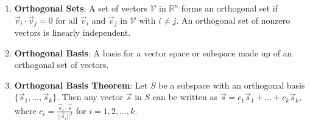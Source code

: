 \documentclass[10pt]{article}
\begin{document}
\begin{enumerate}
\item \textbf{Orthogonal Sets}: A set of vectors $\mathcal{V}$ in $\mathbb{R}^n$ forms an orthogonal set if $\vec{v}_i \cdot \vec{v}_j = 0$ for all $\vec{v}_i$ and $\vec{v}_j$ in $\mathcal{V}$ with $i \neq j$. An orthogonal set of nonzero vectors is linearly independent.
\item \textbf{Orthogonal Basis}: A basis for a vector space or subspace made up of an orthogonal set of vectors.
\item \textbf{Orthogonal Basis Theorem}: Let $S$ be a subspace with an orthogonal basis $\lbrace \vec{s}_1,...,\vec{s}_k \rbrace$. Then any vector $\vec{s}$ in $S$ can be written as $\vec{s} = c_1\vec{s}_1 + ... + c_k\vec{s}_k$, where $c_i = \frac{\vec{s}_i \cdot \vec{s}}{||\vec{s}_i||^2}$ for $i = 1,2,...,k$. 
\end{enumerate}
\end{document}

